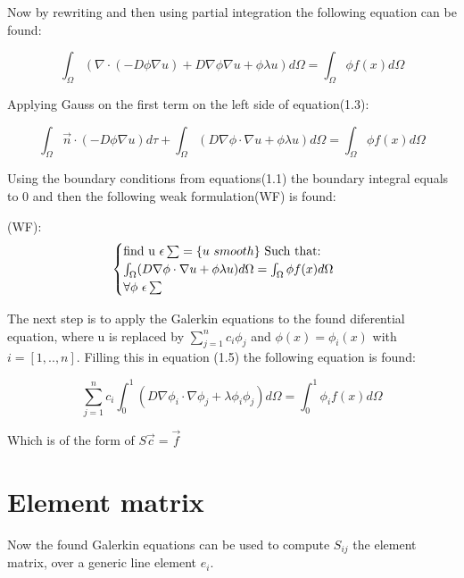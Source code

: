 \documentclass[a4paper]{report}
\begin{document}
Now by rewriting and then using partial integration the following equation can be found:


\begin{equation}
	\int_{\Omega} (\nabla\cdot(-D\phi\nabla u) + D\nabla\phi\nabla u +\phi \lambda u) d\Omega = \int_{\Omega} \phi f(x) d\Omega 
\end{equation}
\smallskip

Applying Gauss on the first term on the left side of equation(1.3):


\begin{equation}
	\int_{\Omega}  \vec{n}\cdot(-D\phi \nabla u) d\tau + \int_{\Omega}  (D\nabla\phi\cdot\nabla u +\phi\lambda u )d\Omega = \int_{\Omega} \phi f(x) d\Omega 
\end{equation}
\smallskip

Using the boundary conditions from equations(1.1) the boundary integral equals to 0 and then the following weak formulation(WF) is found: \vspace{5mm}


(WF): \begin{equation}
\begin{cases} 
	$find u $\epsilon \sum =\{u$ $ smooth\}$ Such that:$ \\ \int_{\Omega}  (D\nabla\phi\cdot\nabla u +\phi\lambda u )d\Omega = \int_{\Omega} \phi f(x) d\Omega \\ \forall\phi $ $ \epsilon\sum 
\end{cases}\  
\end{equation}

\bigskip
The next step is to apply the Galerkin equations to the found diferential equation, where u is replaced by $ \sum_{j=1}^{n}c_i\phi_j $ and  $\phi(x)=\phi_i(x)$ with $i = [1,..,n]$. Filling this in equation (1.5) the following equation is found:

\begin{equation}
	\sum_{j=1}^{n}c_i\int_{0}^{1} (D\nabla\phi_i\cdot\nabla\phi_j +\lambda\phi_i\phi_j )d\Omega = \int_{0}^{1} \phi_i f(x) d\Omega
\end{equation}
\medskip

Which is of the form of $ S\vec{c} = \vec{f} $

\section{Element matrix}
Now the found Galerkin equations can be used to compute $ S_{ij}$  the element matrix, over a generic line element $ e_i$.
\end{document}
